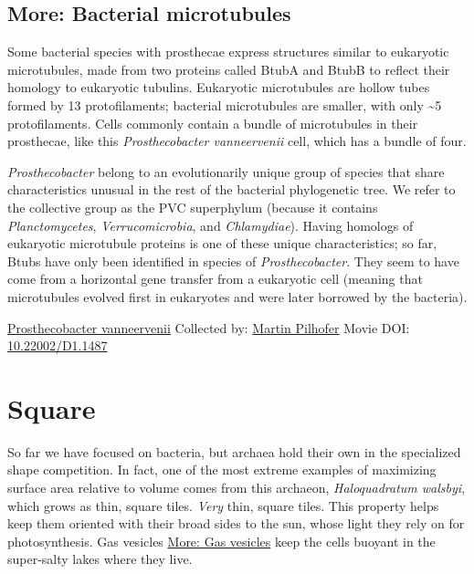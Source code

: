 \documentclass[]{tufte-book}
\begin{document}
\hypertarget{Bacterial_microtubules}{%
\subsection*{More: Bacterial microtubules}\label{Bacterial_microtubules}}

Some bacterial species with prosthecae express structures similar to eukaryotic microtubules, made from two proteins called BtubA and BtubB to reflect their homology to eukaryotic tubulins. Eukaryotic microtubules are hollow tubes formed by 13 protofilaments; bacterial microtubules are smaller, with only \textasciitilde{}5 protofilaments. Cells commonly contain a bundle of microtubules in their prosthecae, like this \emph{Prosthecobacter vanneervenii} cell, which has a bundle of four.

\emph{Prosthecobacter} belong to an evolutionarily unique group of species that share characteristics unusual in the rest of the bacterial phylogenetic tree. We refer to the collective group as the PVC superphylum (because it contains \emph{Planctomycetes}, \emph{Verrucomicrobia}, and \emph{Chlamydiae}). Having homologs of eukaryotic microtubule proteins is one of these unique characteristics; so far, Btubs have only been identified in species of \emph{Prosthecobacter}. They seem to have come from a horizontal gene transfer from a eukaryotic cell (meaning that microtubules evolved first in eukaryotes and were later borrowed by the bacteria).



\hypertarget{htmlwidget-0c689f9052c36813d53a}{}

\label{fig:3-6a}\protect\hyperlink{tree}{Prosthecobacter vanneervenii} Collected by: \protect\hyperlink{martin_pilhofer}{Martin Pilhofer} Movie DOI: \href{https://doi.org/10.22002/D1.1487}{10.22002/D1.1487}

\hypertarget{square}{%
\section{Square}\label{square}}

So far we have focused on bacteria, but archaea hold their own in the specialized shape competition. In fact, one of the most extreme examples of maximizing surface area relative to volume comes from this archaeon, \emph{Haloquadratum walsbyi}, which grows as thin, square tiles. \emph{Very} thin, square tiles. This property helps keep them oriented with their broad sides to the sun, whose light they rely on for photosynthesis. Gas vesicles \protect\hyperlink{Gas_vesicles}{More: Gas vesicles} keep the cells buoyant in the super-salty lakes where they live.
\end{document}
